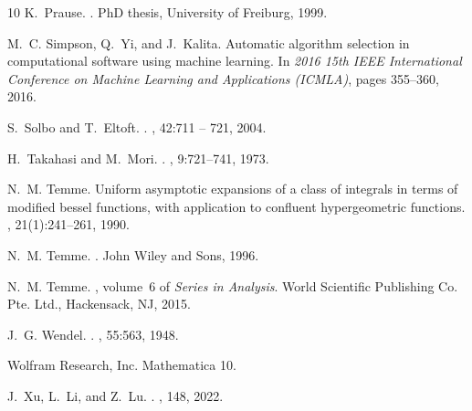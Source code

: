 \documentclass[10pt,a4paper,oneside]{article}
\numberwithin{equation}{section}
\begin{document}
\begin{thebibliography}{10}
K.~Prause.
.
\newblock PhD thesis, University of Freiburg, 1999.


M.~C. Simpson, Q.~Yi, and J.~Kalita.
\newblock Automatic algorithm selection in computational software using machine
  learning.
\newblock In {\em 2016 15th IEEE International Conference on Machine Learning
  and Applications (ICMLA)}, pages 355--360, 2016.


S.~Solbo and T.~Eltoft.
.
, 42:711 --
  721, 2004.

H.~Takahasi and M.~Mori.
.
, 9:721--741, 1973.

N.~M. Temme.
\newblock Uniform asymptotic expansions of a class of integrals in terms of
  modified bessel functions, with application to confluent hypergeometric
  functions.
, 21(1):241--261, 1990.

N.~M. Temme.
.
\newblock John Wiley and Sons, 1996.

N.~M. Temme.
, volume~6 of {\em Series in
  Analysis}.
\newblock World Scientific Publishing Co. Pte. Ltd., Hackensack, NJ, 2015.

J.~G. Wendel.
.
, 55:563, 1948.

{Wolfram Research, Inc.}
\newblock Mathematica 10.

J.~Xu, L.~Li, and Z.~Lu.
.
, 148, 2022.


\end{thebibliography}
\end{document}
